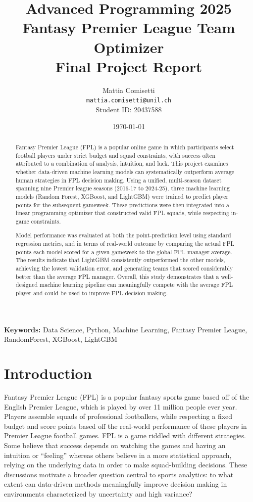 \documentclass[11pt,a4paper]{article}
\title{%
    \Large \textbf{Advanced Programming 2025} \\
    \vspace{0.5cm}
    \LARGE \textbf{Fantasy Premier League Team Optimizer} \\
    \vspace{0.3cm}
    \large Final Project Report
}
\author{
    Mattia Comisetti \\
    \texttt{mattia.comisetti@unil.ch} \\
    Student ID: 20437588
}
\date{\today}
\begin{document}
\maketitle
\thispagestyle{empty}

\begin{abstract}
\noindent
Fantasy Premier League (FPL) is a popular online game in which participants select football players under strict budget and squad constraints, with success often attributed to a combination of analysis, intuition, and luck. This project examines whether data-driven machine learning models can systematically outperform average human strategies in FPL decision making. Using a unified, multi-season dataset spanning nine Premier league seasons (2016-17 to 2024-25), three machine learning models (Random Forest, XGBoost, and LightGBM) were trained to predict player points for the subsequent gameweek. These predictions were then integrated into a linear programming optimizer that constructed valid FPL squads, while respecting in-game constraints. 

Model performance was evaluated at both the point-prediction level using standard regression metrics, and in terms of real-world outcome by comparing the actual FPL points each model scored for a given gameweek to the global FPL manager average. The results indicate that LightGBM consistently outperformed the other models, achieving the lowest validation error, and generating teams that scored considerably better than the average FPL manager. Overall, this study demonstrates that a well-designed machine learning pipeline can meaningfully compete with the average FPL player and could be used to improve FPL decision making. 

\end{abstract}

\vspace{0.5cm}
\noindent\textbf{Keywords:} Data Science, Python, Machine Learning, Fantasy Premier League, RandomForest, XGBoost, LightGBM

\newpage
\tableofcontents
\newpage


\section{Introduction}
\label{sec:introduction}

Fantasy Premier League (FPL) is a popular fantasy sports game based off of the English Premier League, which is played by over 11 million people ever year. Players assemble squads of professional footballers, while respecting a fixed budget and score points based off the real-world performance of these players in Premier League football games. FPL is a game riddled with different strategies. Some believe that success depends on watching the games and having an intuition or “feeling” whereas others believe in a more statistical approach, relying on the underlying data in order to make squad-building decisions. These discussions motivate a broader question central to sports analytics: to what extent can data-driven methods meaningfully improve decision making in environments characterized by uncertainty and high variance? 
\end{document}
